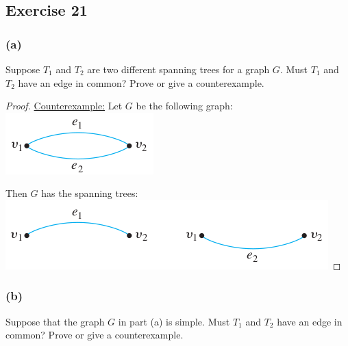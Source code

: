 \documentclass[14pt]{extarticle}
\begin{document}
\subsection{Exercise 21}
\subsubsection{(a)}
Suppose \(T_1\) and \(T_2\) are two different spanning trees for a graph \(G\). Must \(T_1\) and \(T_2\) have an edge in
common? Prove or give a counterexample.

\begin{proof}
    \underline{Counterexample:} Let \(G\) be the following graph:
    \includegraphics[scale=0.5]{../images/10.6.21.a.1.png}

    Then \(G\) has the spanning trees:
    \includegraphics[scale=0.5]{../images/10.6.21.a.2.png}
\end{proof}

\subsubsection{(b)}
Suppose that the graph \(G\) in part (a) is simple. Must \(T_1\) and \(T_2\) have an edge in common? Prove or give a
counterexample.
\end{document}
